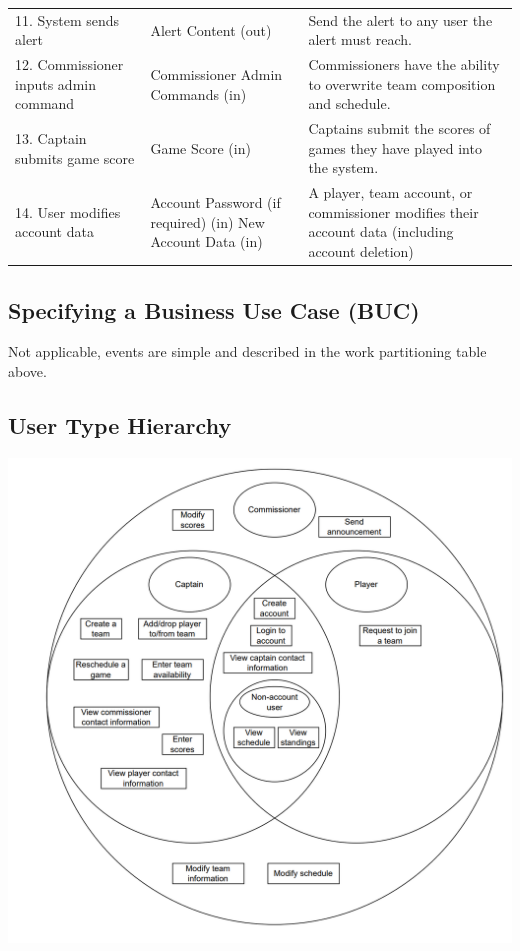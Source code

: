\documentclass[12pt]{article}
\begin{document}
  \begin{center}
    \begin{tabular}{|m{4cm}|m{4cm}|m{6cm}|}
      \hline
      11. System sends alert & Alert Content (out) & Send the alert to any user the
      alert must reach.\\
      12. Commissioner inputs admin command & Commissioner Admin Commands (in)
      & Commissioners have the ability to overwrite team composition and
      schedule.\\
      13. Captain submits game score & Game Score (in)
      & Captains submit the scores of games they have played into the
      system.\\
      14. User modifies account data & Account Password (if required) (in) \newline
      New Account Data (in) 
      & A player, team account, or commissioner modifies their account data (including account deletion)\\
      \hline
    \end{tabular}
  \end{center}

\subsection{Specifying a Business Use Case (BUC)}
Not applicable, events are simple and described in the work partitioning table
above.

\subsection{User Type Hierarchy}
\includegraphics[scale=1.0]{business_data_model.png}
\end{document}
